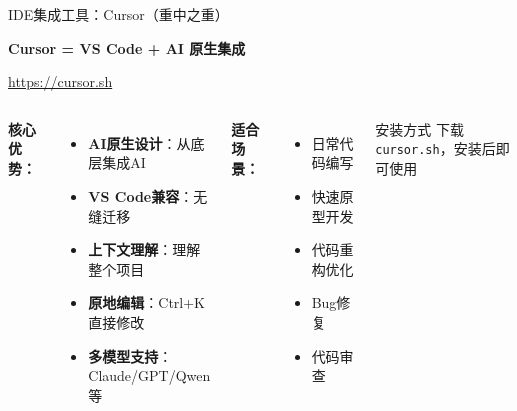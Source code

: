 \begin{frame}{IDE集成工具：Cursor（重中之重）}
	\begin{center}
		\Huge \textbf{Cursor = VS Code + AI 原生集成}

		\vspace{0.5cm}

		\normalsize
		\textcolor{blue}{\url{https://cursor.sh}}
	\end{center}

	\vspace{0.3cm}

	\begin{columns}
		\textbf{核心优势：}
		\begin{itemize}
			\item \textbf{AI原生设计}：从底层集成AI
			\item \textbf{VS Code兼容}：无缝迁移
			\item \textbf{上下文理解}：理解整个项目
			\item \textbf{原地编辑}：Ctrl+K直接修改
			\item \textbf{多模型支持}：Claude/GPT/Qwen等
		\end{itemize}

		\textbf{适合场景：}
		\begin{itemize}
			\item 日常代码编写
			\item 快速原型开发
			\item 代码重构优化
			\item Bug修复
			\item 代码审查
		\end{itemize}

		\vspace{0.3cm}

		\begin{alertblock}{安装方式}
			下载 \texttt{cursor.sh}，安装后即可使用
		\end{alertblock}
	\end{columns}
\end{frame}

